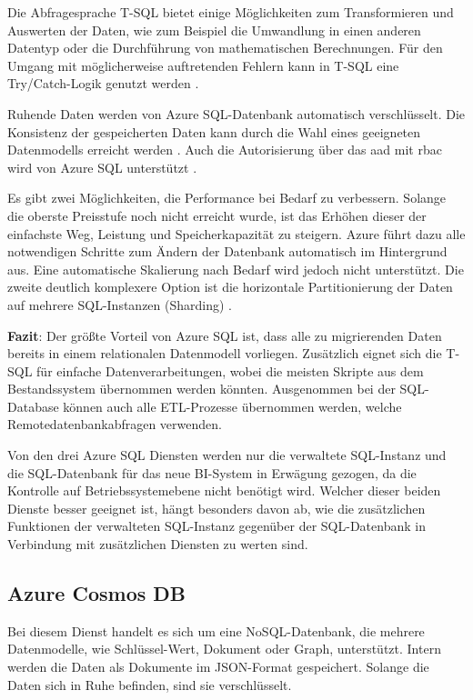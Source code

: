 Die Abfragesprache T-SQL bietet einige Möglichkeiten zum Transformieren und Auswerten der Daten, wie zum Beispiel die Umwandlung in einen anderen Datentyp oder die Durchführung von mathematischen Berechnungen. Für den Umgang mit möglicherweise auftretenden Fehlern kann in T-SQL eine Try/Catch-Logik genutzt werden \cite[vgl.][]{kellenberger_beginning_2021}.

Ruhende Daten werden von Azure SQL-Datenbank automatisch verschlüsselt. Die Konsistenz der gespeicherten Daten kann durch die Wahl eines geeigneten Datenmodells erreicht werden \cite{reagan_web_2018}. Auch die Autorisierung über das \ac{aad} mit \ac{rbac} wird von Azure SQL unterstützt \cite{wolter_authorize_2021}.

Es gibt zwei Möglichkeiten, die Performance bei Bedarf zu verbessern. Solange die oberste Preisstufe noch nicht erreicht wurde, ist das Erhöhen dieser der einfachste Weg, Leistung und Speicherkapazität zu steigern. Azure führt dazu alle notwendigen Schritte zum Ändern der Datenbank automatisch im Hintergrund aus. Eine automatische Skalierung nach Bedarf wird jedoch nicht unterstützt. Die zweite deutlich komplexere Option ist die horizontale Partitionierung der Daten auf mehrere SQL-Instanzen (Sharding) \cite{reagan_web_2018}.

\textbf{Fazit}: Der größte Vorteil von Azure SQL ist, dass alle zu migrierenden Daten bereits in einem relationalen Datenmodell vorliegen. Zusätzlich eignet sich die T-SQL für einfache Datenverarbeitungen, wobei die meisten Skripte aus dem Bestandssystem übernommen werden könnten. Ausgenommen bei der SQL-Database können auch alle ETL-Prozesse übernommen werden, welche Remotedatenbankabfragen verwenden.

Von den drei Azure SQL Diensten werden nur die verwaltete SQL-Instanz und die SQL-Datenbank für das neue BI-System in Erwägung gezogen, da die Kontrolle auf Betriebssystemebene nicht benötigt wird. Welcher dieser beiden Dienste besser geeignet ist, hängt besonders davon ab, wie die zusätzlichen Funktionen der verwalteten SQL-Instanz gegenüber der SQL-Datenbank in Verbindung mit zusätzlichen Diensten zu werten sind.


\subsection{Azure Cosmos DB} \label{sec:grundlagen:azure_dienste:cosmosDB}
Bei diesem Dienst handelt es sich um eine NoSQL-Datenbank, die mehrere Datenmodelle, wie Schlüssel-Wert, Dokument oder Graph, unterstützt. Intern werden die Daten als Dokumente im JSON-Format gespeichert. Solange die Daten sich in Ruhe befinden, sind sie verschlüsselt.

